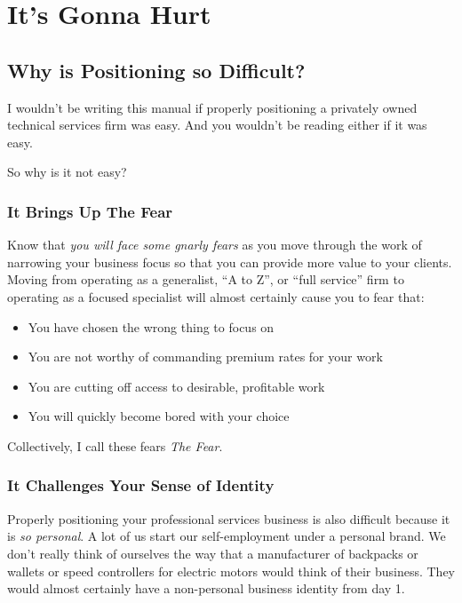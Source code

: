 \chapter{It's Gonna Hurt}

\section{Why is Positioning so Difficult?}

I wouldn't be writing this manual if properly positioning a privately owned technical services firm was easy. And you wouldn't be reading either if it was easy.

So why is it not easy?

\subsection{It Brings Up The Fear}

Know that \emph{you will face some gnarly fears} as you move through the work of narrowing your business focus so that you can provide more value to your clients. Moving from operating as a generalist, ``A to Z'', or ``full service'' firm to operating as a focused specialist will almost certainly cause you to fear that:

\begin{itemize}
\item You have chosen the wrong thing to focus on
\item You are not worthy of commanding premium rates for your work
\item You are cutting off access to desirable, profitable work
\item You will quickly become bored with your choice
\end{itemize}

Collectively, I call these fears \emph{The Fear}.

\subsection{It Challenges Your Sense of Identity}

Properly positioning your professional services business is also difficult because it is \emph{so personal}. A lot of us start our self-employment under a personal brand. We don't really think of ourselves the way that a manufacturer of backpacks or wallets or speed controllers for electric motors would think of their business. They would almost certainly have a non-personal business identity from day 1.

